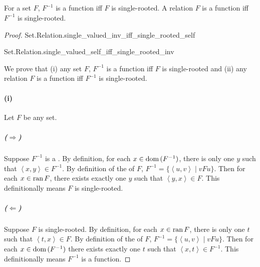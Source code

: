\documentclass{report}
\newcommand{\pair}[1]{\left< #1 \right>}
\begin{document}
\subsection{}%

\begin{theorem}[3F]

  For a set $F$, $F^{-1}$ is a function iff $F$ is single-rooted.
  A relation $F$ is a function iff $F^{-1}$ is single-rooted.

\end{theorem}

\begin{proof}

  \statementpadding

    {Set.Relation.single\_valued\_inv\_iff\_single\_rooted\_self}

    {Set.Relation.single\_valued\_self\_iff\_single\_rooted\_inv}

  We prove that (i) any set $F$, $F^{-1}$ is a function iff $F$ is
    single-rooted and (ii) any relation $F$ is a function iff $F^{-1}$ is
    single-rooted.

  \paragraph{(i)}%

    Let $F$ be any set.

    \subparagraph{($\Rightarrow$)}%

      Suppose $F^{-1}$ is a .
      By definition, for each $x \in \mathop{\text{dom}}{(F^{-1})}$, there is only one $y$
        such that $\pair{x, y} \in F^{-1}$.
      By definition of the  of $F$,
        $F^{-1} = \{\pair{u, v} \mid vFu\}$.
      Then for each $x \in \mathop{\text{ran}}{F}$, there exists exactly one $y$ such that
        $\pair{y, x} \in F$.
      This definitionally means $F$ is single-rooted.

    \subparagraph{($\Leftarrow$)}%

      Suppose $F$ is single-rooted.
      By definition, for each $x \in \mathop{\text{ran}}{F}$, there is only one $t$ such that
        $\pair{t, x} \in F$.
      By definition of the  of $F$,
        $F^{-1} = \{\pair{u, v} \mid vFu\}$.
      Then for each $x \in \mathop{\text{dom}}{(F^{-1})}$ there exists exactly one $t$ such
        that $\pair{x, t} \in F^{-1}$.
      This definitionally means $F^{-1}$ is a function.


\end{proof}
\end{document}
